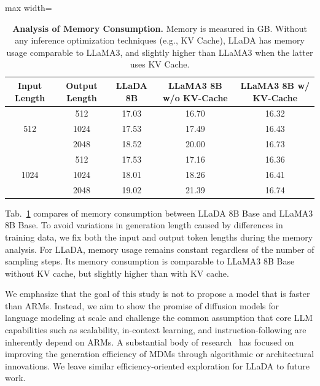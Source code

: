 \documentclass{article}
\begin{document}
\begin{table}[t!]
    \centering 
    \caption{\textbf{Analysis of Memory Consumption.} Memory is measured in GB. Without any inference optimization techniques (e.g., KV Cache), LLaDA has memory usage comparable to LLaMA3, and slightly higher than LLaMA3 when the latter uses KV Cache.} 
    \label{tab:memory}
    \vspace{0.2cm}
    \begin{adjustbox}{max width=\textwidth}
    \begin{tabular}{cc|ccc}
    \toprule
    Input Length & Output Length & LLaDA 8B & LLaMA3 8B w/o KV-Cache & LLaMA3 8B w/ KV-Cache \\
    \midrule
    \multirow{3}{*}{512} & 512 & 17.03 & 16.70 & 16.32 \\
    & 1024 & 17.53  & 17.49 & 16.43\\
    & 2048 & 18.52  & 20.00 & 16.73 \\
    \midrule
    \multirow{3}{*}{1024} & 512 & 17.53 & 17.16 & 16.36\\
    & 1024 & 18.01 & 18.26 & 16.41\\
    & 2048 & 19.02 & 21.39 & 16.74\\
    \bottomrule     
    \end{tabular}
    \end{adjustbox}
    \vspace{-.2cm}
\end{table}


Tab.~\ref{tab:memory} compares of memory consumption between LLaDA 8B Base and LLaMA3 8B Base. To avoid variations in generation length caused by differences in training data, we fix both the input and output token lengths during the memory analysis. For LLaDA, memory usage remains constant regardless of the number of sampling steps. Its memory consumption is comparable to LLaMA3 8B Base without KV cache, but slightly higher than with KV cache.

We emphasize that the goal of this study is not to propose a model that is faster than ARMs. Instead, we aim to show the promise of diffusion models for language modeling at scale and challenge the common assumption that core LLM capabilities such as scalability, in-context learning, and instruction-following are inherently depend on ARMs. A substantial body of research~\citep{arriola2025block, xu2025show, liu2024think, zhu2025di, ren2025fast, hayakawa2024distillation, zhao2024informed, zheng2024masked, park2024jump, deschenaux2024beyond} has focused on improving the generation efficiency of MDMs through algorithmic or architectural innovations. We leave similar efficiency-oriented exploration for LLaDA to future work.
\end{document}
